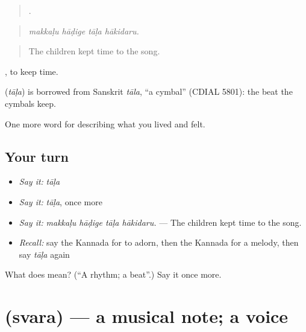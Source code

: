 \begin{quote}
   .
\end{quote}

\begin{quote}
\emph{makkaḷu hāḍige tāḷa hākidaru.}
\end{quote}

\begin{quote}
The children kept time to the song.
\end{quote}

 , to keep time.

\begin{cousinweb}
\textbf{} (\emph{tāḷa}) is borrowed from Sanskrit \emph{tāla}, \textquotedblleft{}a cymbal\textquotedblright{} (CDIAL 5801): the beat the cymbals keep.
\end{cousinweb}

\begin{grammarlens}[title={What you've built}]
One more word for describing what you lived and felt.
\end{grammarlens}

\subsection*{Your turn}
\begin{itemize}
\raggedright
  \item \emph{Say it:} \emph{tāḷa}
  \item \emph{Say it:} \emph{tāḷa}, once more
  \item \emph{Say it:} \emph{makkaḷu hāḍige tāḷa hākidaru.} — The children kept time to the song.
  \item \emph{Recall:} say the Kannada for to adorn, then the Kannada for a melody, then say \emph{tāḷa} again
\end{itemize}

\begin{tcolorbox}[breakable,colback=teal!4,colframe=teal!35!black,title={Before you move on}]
What does  mean? (\textquotedblleft{}A rhythm; a beat\textquotedblright{}.) Say it once more.
\end{tcolorbox}
\section[\texorpdfstring{\kn{ಸ್ವರ} (svara)}{ಸ್ವರ (svara)}]{ (svara) — a musical note; a voice}

\label{lesson:KA-C534-svara}



